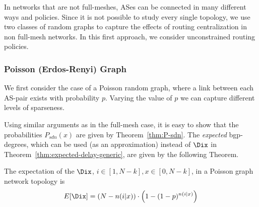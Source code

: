 In networks that are not full-meshes, ASes can be connected in many different ways and policies. Since it is not possible to study every single topology, we use two classes of random graphs to capture the effects of routing centralization in non full-mesh networks. In this first approach, we consider unconstrained routing policies.



\subsubsection{Poisson (Erdos-Renyi) Graph}
We first consider the case of a Poisson random graph, where a link between each AS-pair exists with probability $p$. Varying the value of $p$ we can capture different levels of sparseness.

Using similar arguments as in the full-mesh case, it is easy to show that the probabilities $P_{sdn}(x)$ are given by Theorem~\ref{thm:P-sdn}. The \textit{expected} bgp-degrees, which can be used (as an approximation) instead of $\Dix$ in Theorem~\ref{thm:expected-delay-generic}, are given by the following Theorem. 
\begin{theorem}\label{thm:Dix-poisson}
The expectation of the \bgp $\Dix$, $i\in[1,N-k], x\in[0,N-k]$, in a Poisson graph network topology is
\begin{equation}
E[\Dix] = \left(N-n(i|x)\right) \cdot \left(1-(1-p)^{n(i|x)}\right)
\end{equation}
\end{theorem}
